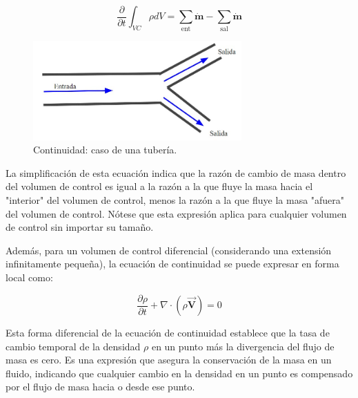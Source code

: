 \documentclass[10pt, oneside]{article}
\begin{document}
\begin{equation}
\frac{\partial}{\partial t} \int_{VC}\rho dV= \sum_{\text{ent}} \dot{\bm{m}} - \sum_{\text{sal}}\dot{\bm{m}}
\end{equation}

\begin{figure}[h]
\centering
\includegraphics[width=8cm]{Fig.12.jpg}
\caption{Continuidad: caso de una tubería.}
\label{tmove}
\end{figure}

La simplificación de esta ecuación indica que la razón de cambio de masa dentro del volumen de control es igual a la razón a la que fluye la masa hacia el "interior" del volumen de control, menos la razón a la que fluye la masa "afuera" del volumen de control. Nótese que esta expresión aplica para cualquier volumen de control sin importar su tamaño.

Además, para un volumen de control diferencial (considerando una extensión infinitamente pequeña), la ecuación de continuidad se puede expresar en forma local como:

\begin{equation}
\frac{\partial \rho}{\partial t} + \nabla \cdot (\rho \mathbf{\vec{V}}) = 0
\end{equation}

Esta forma diferencial de la ecuación de continuidad establece que la tasa de cambio temporal de la densidad $\rho$ en un punto más la divergencia del flujo de masa es cero. Es una expresión que asegura la conservación de la masa en un fluido, indicando que cualquier cambio en la densidad en un punto es compensado por el flujo de masa hacia o desde ese punto.
\end{document}
